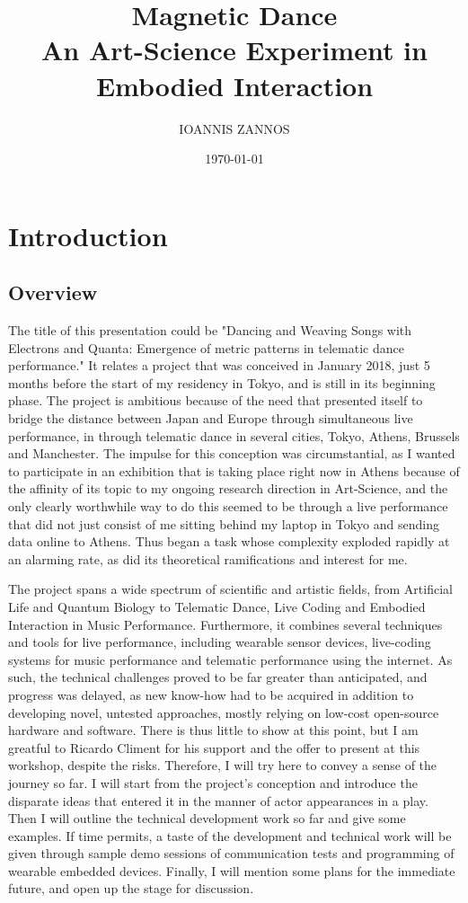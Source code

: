 \documentclass[11pt]{article}
\author{IOANNIS ZANNOS}
\date{\today}
\title{Magnetic Dance\\\medskip
\large An Art-Science Experiment in Embodied Interaction}
\begin{document}
\maketitle
\tableofcontents


\section{Introduction}
\label{sec:orgc20f3e9}

\subsection{Overview}
\label{sec:org5162467}
The title of this presentation could be "Dancing and Weaving Songs with Electrons and Quanta:  Emergence of metric patterns in telematic dance performance."  It relates a project that was conceived in January 2018, just 5 months before the start of my residency in Tokyo, and is still in its beginning phase.  The project is ambitious because of the need that presented itself to bridge the distance between Japan and Europe through simultaneous live performance, in through telematic dance in several cities, Tokyo, Athens, Brussels and Manchester.  The impulse for this conception was circumstantial, as I wanted to participate in an exhibition that is taking place right now in Athens because of the affinity of its topic to my ongoing research direction in Art-Science, and the only clearly worthwhile way to do this seemed to be through a live performance that did not just consist of me sitting behind my laptop in Tokyo and sending data online to Athens.  Thus began a task whose complexity exploded rapidly at an alarming rate, as did its theoretical ramifications and interest for me.

The project spans a wide spectrum of scientific and artistic fields, from Artificial Life and Quantum Biology to Telematic Dance, Live Coding and Embodied Interaction in Music Performance.  Furthermore, it combines several techniques and tools for live performance, including wearable sensor devices, live-coding systems for music performance and telematic performance using the internet.  As such, the technical challenges proved to be far greater than anticipated, and progress was delayed, as new know-how had to be acquired in addition to developing novel, untested approaches, mostly relying on low-cost open-source hardware and software.  There is thus little to show at this point, but I am greatful to Ricardo Climent for his support and the offer to present at this workshop, despite the risks.  Therefore, I will try here to convey a sense of the journey so far. I will start from the project's conception and introduce the disparate ideas that entered it in the manner of actor appearances in a play.  Then I will outline the technical development work so far and give some examples.  If time permits, a taste of the development and technical work will be given through sample demo sessions of communication tests and programming of wearable embedded devices. Finally, I will mention some plans for the immediate future, and open up the stage for discussion.  
\end{document}
